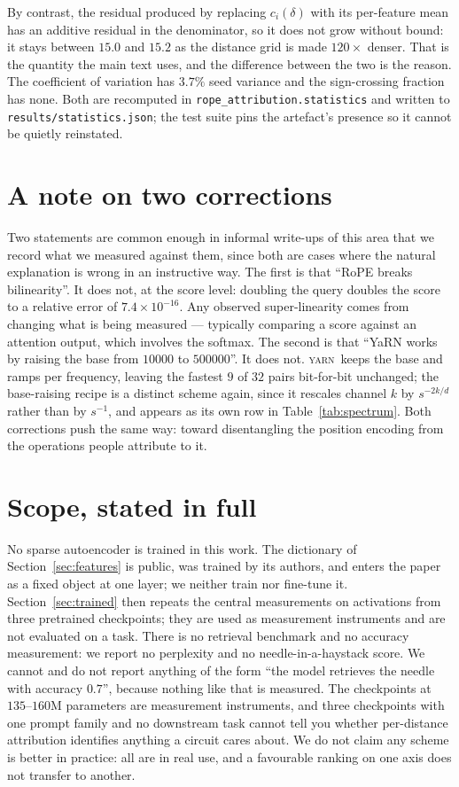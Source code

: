 \documentclass{article}
\theoremstyle{plain}
\theoremstyle{remark}
\newcommand{\yarn}{\textsc{yarn}}
\begin{document}
By contrast, the residual produced by replacing $c_i(\delta)$ with its
per-feature mean has an additive residual in the denominator, so it does not grow
without bound: it stays between $15.0$ and $15.2$ as the distance grid is made
$120\times$ denser. That is the quantity the main text uses, and the difference
between the two is the reason. The coefficient of variation has $3.7\%$ seed
variance and the sign-crossing fraction has none. Both are recomputed in
\texttt{rope\_attribution.statistics} and written to
\texttt{results/statistics.json}; the test suite pins the artefact's presence so
it cannot be quietly reinstated.

\section{A note on two corrections}
\label{app:note}

Two statements are common enough in informal write-ups of this area that we
record what we measured against them, since both are cases where the natural
explanation is wrong in an instructive way. The first is that ``RoPE breaks
bilinearity''. It does not, at the score level: doubling the query doubles the
score to a relative error of $7.4\times10^{-16}$. Any observed super-linearity
comes from changing what is being measured --- typically comparing a score
against an attention output, which involves the softmax. The second is that
``YaRN works by raising the base from $10000$ to $500000$''. It does not.
\yarn\ keeps the base and ramps per frequency, leaving the fastest $9$ of $32$
pairs bit-for-bit unchanged; the base-raising recipe is a distinct scheme again,
since it rescales channel $k$ by $s^{-2k/d}$ rather than by $s^{-1}$, and
appears as its own row in
Table~\ref{tab:spectrum}. Both corrections push the same way: toward
disentangling the position encoding from the operations people attribute to it.

\section{Scope, stated in full}
\label{app:scope}

No sparse autoencoder is trained in this work. The dictionary of
Section~\ref{sec:features} is public, was trained by its authors, and enters the
paper as a fixed object at one layer; we neither train nor fine-tune it.
Section~\ref{sec:trained} then repeats the central measurements on activations
from three pretrained checkpoints; they are used as measurement instruments and
are not evaluated on a task. There is no retrieval benchmark and no accuracy
measurement: we report no perplexity and no needle-in-a-haystack score. We
cannot and do not report anything of the form ``the model retrieves the needle
with accuracy $0.7$'', because nothing like that is measured.
The checkpoints at $135$--$160$M parameters are measurement instruments, and
three checkpoints with
one prompt family and no downstream task cannot tell you whether per-distance
attribution identifies anything a circuit cares about. We do not claim any
scheme is better in practice: all are in real use, and a favourable ranking on
one axis does not transfer to another.
\end{document}
